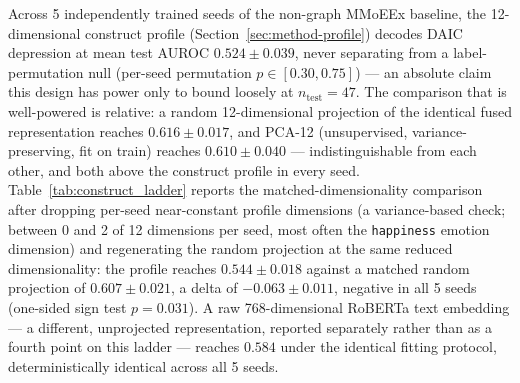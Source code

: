 \documentclass[letterpaper]{article}
\begin{document}
Across 5 independently trained seeds of the non-graph MMoEEx baseline, the 12-dimensional construct profile (Section~\ref{sec:method-profile}) decodes DAIC depression at mean test AUROC $0.524 \pm 0.039$, never separating from a label-permutation null (per-seed permutation $p \in [0.30, 0.75]$) — an absolute claim this design has power only to bound loosely at $n_{\text{test}}{=}47$. The comparison that is well-powered is relative: a random 12-dimensional projection of the identical fused representation reaches $0.616 \pm 0.017$, and PCA-12 (unsupervised, variance-preserving, fit on train) reaches $0.610 \pm 0.040$ — indistinguishable from each other, and both above the construct profile in every seed. Table~\ref{tab:construct_ladder} reports the matched-dimensionality comparison after dropping per-seed near-constant profile dimensions (a variance-based check; between 0 and 2 of 12 dimensions per seed, most often the \texttt{happiness} emotion dimension) and regenerating the random projection at the same reduced dimensionality: the profile reaches $0.544 \pm 0.018$ against a matched random projection of $0.607 \pm 0.021$, a delta of $-0.063 \pm 0.011$, negative in all 5 seeds (one-sided sign test $p{=}0.031$). A raw 768-dimensional RoBERTa text embedding — a different, unprojected representation, reported separately rather than as a fourth point on this ladder — reaches $0.584$ under the identical fitting protocol, deterministically identical across all 5 seeds.
\end{document}
